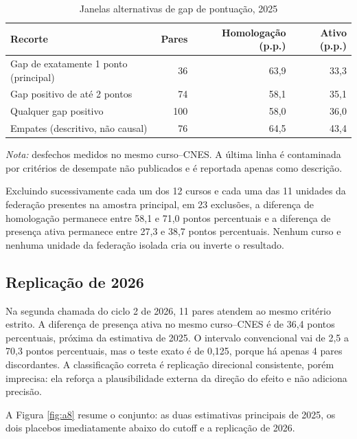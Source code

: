 \documentclass[11pt,a4paper]{article}
\begin{document}
\begin{table}[htbp]
\centering
\small
\caption{Janelas alternativas de gap de pontuação, 2025}
\label{tab:gap}
\begin{tabular}{lrrr}
\toprule
Recorte & Pares & Homologação (p.p.) & Ativo (p.p.) \\
\midrule
Gap de exatamente 1 ponto (principal) & 36 & 63,9 & 33,3 \\
Gap positivo de até 2 pontos & 74 & 58,1 & 35,1 \\
Qualquer gap positivo & 100 & 58,0 & 36,0 \\
Empates (descritivo, não causal) & 76 & 64,5 & 43,4 \\
\bottomrule
\end{tabular}

\vspace{2pt}
\begin{minipage}{0.9\textwidth}
\footnotesize \textit{Nota:} desfechos medidos no mesmo curso--CNES. A última
linha é contaminada por critérios de desempate não publicados e é reportada
apenas como descrição.
\end{minipage}
\end{table}

Excluindo sucessivamente cada um dos 12 cursos e cada uma das 11 unidades da
federação presentes na amostra principal, em 23 exclusões, a diferença de
homologação permanece entre 58,1 e 71,0 pontos percentuais e a diferença de
presença ativa permanece entre 27,3 e 38,7 pontos percentuais. Nenhum curso e
nenhuma unidade da federação isolada cria ou inverte o resultado.

\subsection{Replicação de 2026}

Na segunda chamada do ciclo 2 de 2026, 11 pares atendem ao mesmo critério
estrito. A diferença de presença ativa no mesmo curso--CNES é de 36,4 pontos
percentuais, próxima da estimativa de 2025. O intervalo convencional vai de 2,5 a
70,3 pontos percentuais, mas o teste exato é de 0,125, porque há apenas 4 pares
discordantes. A classificação correta é replicação direcional consistente, porém
imprecisa: ela reforça a plausibilidade externa da direção do efeito e não
adiciona precisão.

A Figura \ref{fig:a8} resume o conjunto: as duas estimativas principais de 2025,
os dois placebos imediatamente abaixo do cutoff e a replicação de 2026.
\end{document}
